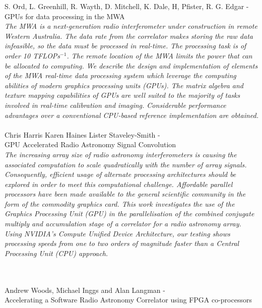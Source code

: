 \noindent
{\large S. Ord, L. Greenhill, R. Wayth, D. Mitchell, K. Dale, H, Pfister, R. G. Edgar - GPUs  for data processing in the MWA}\\
\indent
\textit{The MWA is a next-generation radio interferometer under construction
in remote Western Australia. The data rate from the correlator makes
storing the raw data infeasible, so the data must be processed in real-time. The
processing task is of order 10 TFLOPs$^{-1}$. The remote location of the MWA
limits the power that can be allocated to computing. We describe the design and
implementation of elements of the MWA real-time data processing system which
leverage the computing abilities of modern graphics processing units (GPUs).
The matrix algebra and texture mapping capabilities of GPUs are well suited to
the majority of tasks involved in real-time calibration and imaging. Considerable
performance advantages over a conventional CPU-based reference implementation
are obtained.}
\hfill\\\\
{\large Chris Harris Karen Haines Lister Staveley-Smith - \hfill \\ GPU Accelerated Radio Astronomy Signal Convolution }\\
\indent
\textit{
The increasing array size of radio astronomy interferometers is causing the associated computation to scale quadratically with the number of array signals. Consequently, efficient usage of alternate processing architectures should be explored in order to meet this computational challenge. Affordable parallel processors have been made available to the general scientific community in the form of the commodity graphics card. This work investigates the use of the Graphics Processing Unit (GPU) in the parallelisation of the combined conjugate multiply and accumulation stage of a correlator for a radio astronomy array. Using NVIDIA’s Compute Unified Device Architecture, our testing shows processing speeds from one to two orders of magnitude faster than a Central Processing
Unit (CPU) approach.
}

\hfill\\\\
{\large Andrew Woods,
Michael Inggs and Alan Langman - \hfill \\ Accelerating a Software Radio Astronomy
Correlator using FPGA co-processors }

